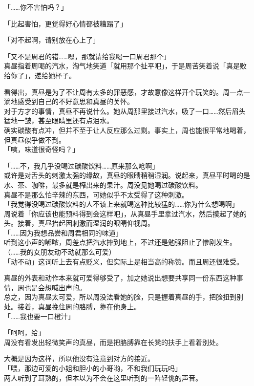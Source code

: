 「……你不害怕吗？」

「比起害怕，更觉得好心情都被糟蹋了」

「对不起啊，请别放在心上了」

「又不是周君的错……嗯，那就请给我喝一口周君那个」\\

真昼指着周喝的汽水，淘气地笑道「就用那个扯平吧」，于是周苦笑着说「真是败给你了」，递给她杯子。

看得出，真昼是为了不让周有太多的罪恶感，才故意像这样开个玩笑的。周一点一滴地感受到自己的不好意思和真昼的关怀。\\

对于方才的事情，真昼不再说什么。她从周那里接过汽水，吸了一口……然后眉头猛地一皱，甚至眼睛里还有点泪水。\\

确实碳酸有点冲，但并不至于让人反应那么过剩。事实上，周也能很平常地喝着，但真昼似乎做不到。\\

「咦，味道很奇怪吗？」

「……不，我几乎没喝过碳酸饮料……原来那么呛啊」\\

或许是对舌头的刺激太强的缘故，真昼的眼睛稍稍湿润。说起来，真昼平时喝的是水、茶、咖啡，最多就是榨出来的果汁。周没见她喝过碳酸饮料。\\

真昼不是那么怕辛辣的东西，可她似乎不太受得了这种刺激。\\

「我觉得没喝过碳酸饮料的人不该上来就喝这种比较猛的……你为什么想喝啊」\\

周说着「你应该也能预料得到会这样吧」，从真昼手里拿过汽水，然后摸起了她的头。接着，真昼抬起因刺激而湿润的眼睛仰视周。\\

「……因为我想品尝和周君相同的味道」\\

听到这小声的嘟哝，周差点把汽水摔到地上，不过还是勉强阻止了惨剧发生。\\

（……我的女朋友动不动就那么可爱）\\

「动不动」这词听上去有点贬义，但实际上是相当高的称赞。而且周还很难受。

真昼的外表和动作本来就可爱得够受了，加之她说出想要共享同一份东西这种事情，周也是会想喊出声的。\\

总之，因为真昼太可爱，所以周没法看她的脸，只是握着真昼的手，把脸扭到别处。接着，真昼挽住周的胳膊，靠在他身上。\\

「……我也要一口橙汁」

「呵呵，给」\\

周没有看发出轻微笑声的真昼，而是把胳膊靠在长凳的扶手上看着别处。

大概是因为这样，所以他没有注意到对方的接近。\\

「喂，那边可爱的小姐和胆小的小哥哟，不和我们玩玩吗」\\

两人听到了耳熟的，但本以为不会在这里听到的一阵轻佻的声音。
